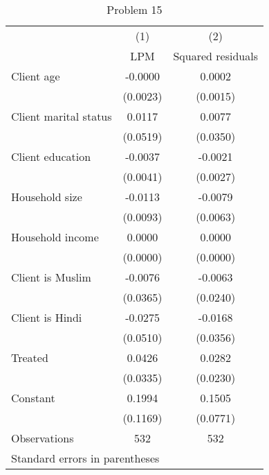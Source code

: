 \begin{table}[htbp]\centering
\caption{Problem 15\label{q15}}
\begin{tabular}{l*{2}{c}}
\toprule
                    &\multicolumn{1}{c}{(1)}&\multicolumn{1}{c}{(2)}\\
                    &\multicolumn{1}{c}{LPM}&\multicolumn{1}{c}{Squared residuals}\\
\midrule
Client age          &     -0.0000&      0.0002\\
                    &    (0.0023)&    (0.0015)\\
\addlinespace
Client marital status&      0.0117&      0.0077\\
                    &    (0.0519)&    (0.0350)\\
\addlinespace
Client education    &     -0.0037&     -0.0021\\
                    &    (0.0041)&    (0.0027)\\
\addlinespace
Household size      &     -0.0113&     -0.0079\\
                    &    (0.0093)&    (0.0063)\\
\addlinespace
Household income    &      0.0000&      0.0000\\
                    &    (0.0000)&    (0.0000)\\
\addlinespace
Client is Muslim    &     -0.0076&     -0.0063\\
                    &    (0.0365)&    (0.0240)\\
\addlinespace
Client is Hindi     &     -0.0275&     -0.0168\\
                    &    (0.0510)&    (0.0356)\\
\addlinespace
Treated             &      0.0426&      0.0282\\
                    &    (0.0335)&    (0.0230)\\
\addlinespace
Constant            &      0.1994&      0.1505\\
                    &    (0.1169)&    (0.0771)\\
\midrule
Observations        &         532&         532\\
\bottomrule
\multicolumn{3}{l}{\footnotesize Standard errors in parentheses}\\
\end{tabular}
\end{table}
